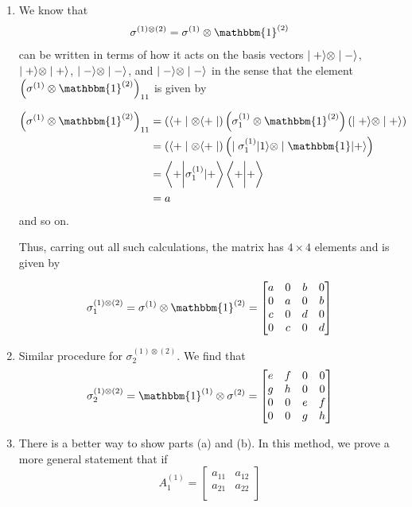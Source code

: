 \documentclass[twoside]{article}
\begin{document}
\begin{enumerate}
   \item We know that
   \begin{align*}
      \sigma^{(1) \otimes (2)} = \sigma^{(1)} \otimes \mathbbm{1}^{(2)}
   \end{align*}
   can be written in terms of how it acts on the basis vectors $\mid+\rangle \otimes \mid-\rangle$, $\mid+\rangle \otimes \mid+\rangle$, $\mid-\rangle \otimes \mid-\rangle$, and $\mid-\rangle \otimes \mid-\rangle$ in the sense that the element $\left(\sigma^{(1)} \otimes \mathbbm{1}^{(2)}\right)_{11}$ is given by 

   \begin{align*}
      \left(\sigma^{(1)} \otimes \mathbbm{1}^{(2)}\right)_{11} &= \left(\bra{+}\otimes\bra{+}\right)\left(\sigma_1^{(1)} \otimes \mathbbm{1}^{(2)}\right)\left(\ket{+}\otimes\ket{+}\right) \\
      &= \left(\bra{+}\otimes\bra{+}\right) \left( \ket{\sigma_1^{(1)} | 1} \otimes \ket{\mathbbm{1}|+}\right) \\
      &= \inner{+}{\sigma_1^{(1)}|+} \inner{+}{+} \\
      &= a
   \end{align*}
   and so on.

   Thus, carring out all such calculations, the matrix has $4 \times 4$ elements and is given by 

   \[ \sigma_1^{(1) \otimes (2)} = \sigma^{(1)} \otimes \mathbbm{1}^{(2)} = \begin{bmatrix}
         a & 0 & b & 0 \\
         0 & a & 0 & b \\
         c & 0 & d & 0 \\
         0 & c & 0 & d 
      \end{bmatrix} \]


   \item Similar procedure for $\sigma_2^{(1) \otimes (2)}$. We find that 
   \[ \sigma_2^{(1) \otimes (2)} = \mathbbm{1}^{(1)} \otimes \sigma^{(2)} = \begin{bmatrix}
      e & f & 0 & 0 \\
      g & h & 0 & 0 \\
      0 & 0 & e & f \\
      0 & 0 & g & h 
   \end{bmatrix} \]
   
   \item There is a better way to show parts (a) and (b). In this method, we prove a more general statement that if 
   \[ A_1^{(1)} = \begin{bmatrix}
      a_{11} & a_{12} \\
      a_{21} & a_{22} \\
   \end{bmatrix} \]


\end{enumerate}
\end{document}
